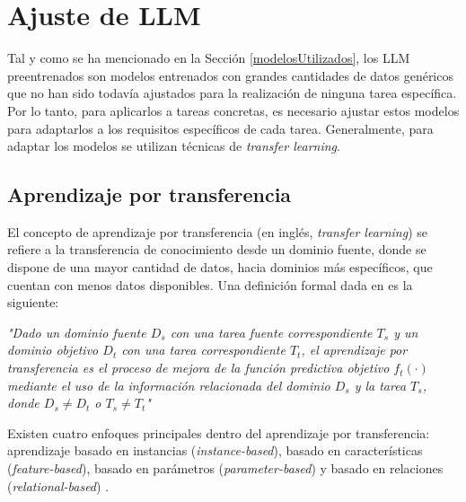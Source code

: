 \documentclass[11pt,spanish,listoffigures,listoftables]{tfgetsinf}
\begin{document}
\section{Ajuste de LLM}

Tal y como se ha mencionado en la Sección \ref{modelosUtilizados}, los LLM preentrenados son modelos entrenados con grandes cantidades de datos genéricos que no han sido todavía ajustados para la realización de ninguna tarea específica. Por lo tanto, para aplicarlos a tareas concretas, es necesario ajustar estos modelos para adaptarlos a los requisitos específicos de cada tarea. Generalmente, para adaptar los modelos se utilizan técnicas de \textit{transfer learning}.

\subsection{Aprendizaje por transferencia}

El concepto de aprendizaje por transferencia (en inglés, \textit{transfer learning}) se refiere a la transferencia de conocimiento desde un dominio fuente, donde se dispone de una mayor cantidad de datos, hacia dominios más específicos, que cuentan con menos datos disponibles. Una definición formal dada en \cite{Weiss2016} es la siguiente:

\begin{displayquote}
\textit{"Dado un dominio fuente $D_s$ con una tarea fuente correspondiente $T_s$ y un dominio objetivo $D_t$ con una tarea correspondiente $T_t$, el aprendizaje por transferencia es el proceso de mejora de la función predictiva objetivo $f_t(\cdot)$ mediante el uso de la información relacionada del dominio $D_s$ y la tarea $T_s$, donde $D_s \neq D_t$ o $T_s \neq T_t$"}
\end{displayquote}

Existen cuatro enfoques principales dentro del aprendizaje por transferencia: aprendizaje basado en instancias (\textit{instance-based}), basado en características (\textit{feature-based}), basado en parámetros (\textit{parameter-based}) y basado en relaciones (\textit{relational-based}) \cite{Weiss2016}.
\end{document}
